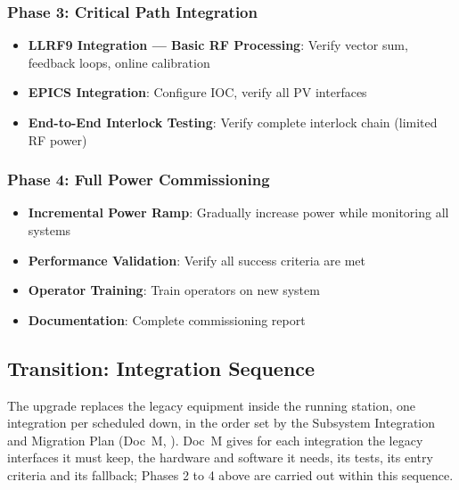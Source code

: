 \subsubsection{Phase 3: Critical Path Integration}\label{phase-3-critical-path-integration}

\begin{itemize}
\tightlist
\item
  \textbf{LLRF9 Integration --- Basic RF Processing}: Verify vector sum, feedback loops, online calibration
\item
  \textbf{EPICS Integration}: Configure IOC, verify all PV interfaces
\item
  \textbf{End-to-End Interlock Testing}: Verify complete interlock chain (limited RF power)
\end{itemize}

\subsubsection{Phase 4: Full Power Commissioning}\label{phase-4-full-power-commissioning}

\begin{itemize}
\tightlist
\item
  \textbf{Incremental Power Ramp}: Gradually increase power while monitoring all systems
\item
  \textbf{Performance Validation}: Verify all success criteria are met
\item
  \textbf{Operator Training}: Train operators on new system
\item
  \textbf{Documentation}: Complete commissioning report
\end{itemize}

\subsection{Transition: Integration Sequence}\label{transition-integration-sequence}

The upgrade replaces the legacy equipment inside the running station, one integration per scheduled down, in the order set by the Subsystem Integration and Migration Plan (Doc~M, ). Doc~M gives for each integration the legacy interfaces it must keep, the hardware and software it needs, its tests, its entry criteria and its fallback; Phases 2 to 4 above are carried out within this sequence.

